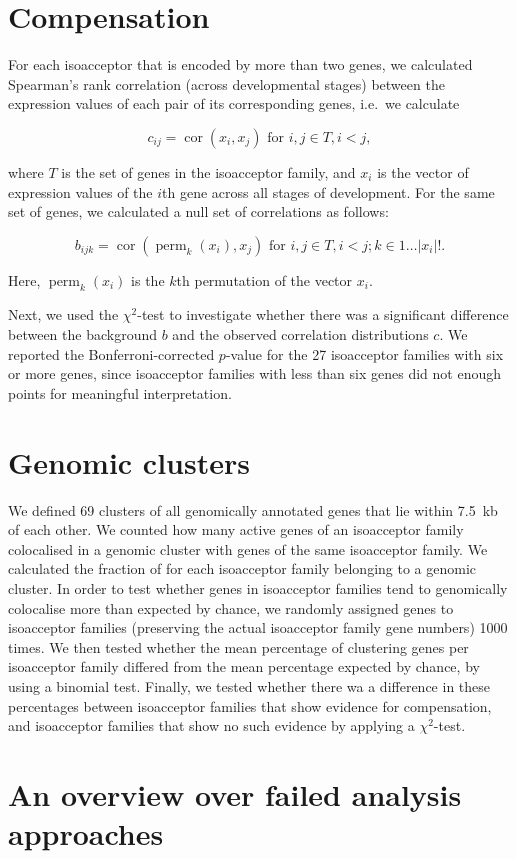 \section{Compensation}

For each isoacceptor that is encoded by more than two \trna genes, we calculated
Spearman’s rank correlation (across developmental stages) between the expression
values of each pair of its corresponding \trna genes, i.e.\ we calculate

\begin{equation}
    c_{ij} = \operatorname{cor}(x_i, x_j) \text{ for \(i, j \in T, i < j\)},
\end{equation}

where \(T\) is the set of \trna genes in the isoacceptor family, and \(x_i\) is
the vector of expression values of the \(i\)th \trna gene across all stages of
development. For the same set of genes, we calculated a null set of correlations
as follows:

\begin{equation}
    b_{ijk} = \operatorname{cor}(\operatorname{perm}_k(x_i), x_j)
        \text{ for \(i, j \in T, i < j; k \in 1\dots\lvert x_i\rvert!\)}.
\end{equation}

Here, \(\operatorname{perm}_k(x_i)\) is the \(k\)th permutation of the vector
\(x_i\).

Next, we used the \(\chi^2\)-test to investigate whether there was a significant
difference between the background \(b\) and the observed correlation
distributions \(c\). We reported the Bonferroni-corrected \(p\)-value for the
\num{27} isoacceptor families with six or more genes, since isoacceptor families
with less than six genes did not enough points for meaningful interpretation.

\section{Genomic clusters}

We defined \num{69} clusters of all genomically annotated \trna genes that lie
within \SI{7.5}{kb} of each other. We counted how many active \trna genes of an
isoacceptor family colocalised in a genomic cluster with \trna genes of the same
isoacceptor family. We calculated the fraction of \trna for each isoacceptor
family belonging to a genomic cluster. In order to test whether genes in
isoacceptor families tend to genomically colocalise more than expected by
chance, we randomly assigned \trna genes to isoacceptor families (preserving the
actual isoacceptor family gene numbers) \num{1000} times. We then tested whether
the mean percentage of clustering \trna genes per isoacceptor family differed
from the mean percentage expected by chance, by using a binomial test. Finally,
we tested whether there wa a difference in these percentages between isoacceptor
families that show evidence for compensation, and isoacceptor families that show
no such evidence by applying a \(\chi^2\)-test.

\section{An overview over failed analysis approaches}
